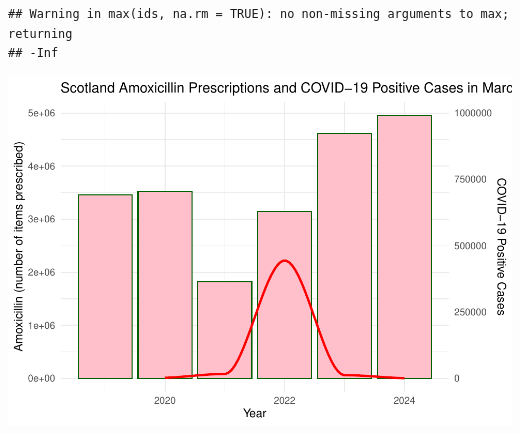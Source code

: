 \documentclass[
]{article}
\begin{document}
\begin{verbatim}
## Warning in max(ids, na.rm = TRUE): no non-missing arguments to max; returning
## -Inf
\end{verbatim}

\includegraphics{index_files/figure-latex/unnamed-chunk-1-2.pdf}
\end{document}
